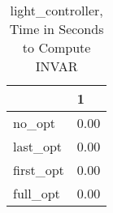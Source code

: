 \begin{table}
\caption{light\_controller, Time in Seconds to Compute INVAR}
\label{light_controller_INVAR_time}
\begin{tabular}{ll}
\toprule
 & 1 \\
\midrule
no\_opt & 0.00 \\
last\_opt & 0.00 \\
first\_opt & 0.00 \\
full\_opt & 0.00 \\
\bottomrule
\end{tabular}
\end{table}
